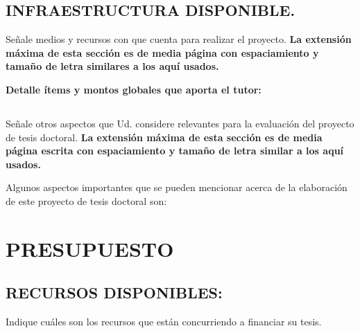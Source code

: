 \documentclass[11pt,letterpaper]{article}
\begin{document}
\newpage 

\subsection{INFRAESTRUCTURA DISPONIBLE.} Señale medios y recursos con que cuenta para realizar el proyecto. \textbf{La extensión máxima de esta sección es de media página con espaciamiento y tamaño de letra similares a los aquí usados. }

\begin{tcolorbox}[breakable]

\lipsum[41-42]

\end{tcolorbox}

\begin{tcolorbox}[breakable]
\textbf{Detalle ítems y montos globales que aporta el tutor:
} \\

\lipsum[43]

\blindenumerate[2]

\end{tcolorbox}

\newpage

\subsection{} Señale otros aspectos que Ud. considere relevantes para la evaluación del proyecto de tesis doctoral. \textbf{La extensión máxima de esta sección es de media página escrita con espaciamiento y tamaño de letra similar a los aquí usados.}

\begin{tcolorbox}[breakable]
Algunos aspectos importantes que se pueden mencionar acerca de la elaboración de este proyecto de tesis doctoral son:

\blindenumerate[5]

\end{tcolorbox}


\newpage

\section{PRESUPUESTO}

\subsection{RECURSOS DISPONIBLES:} Indique cuáles son los recursos que están concurriendo a financiar su tesis.
\end{document}
